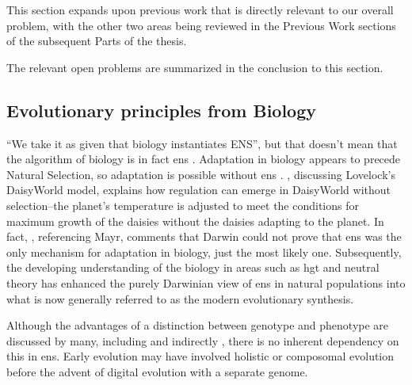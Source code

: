 This section expands upon previous work that is directly relevant to our overall problem, with the other two areas being reviewed in the Previous Work sections of the subsequent Parts of the thesis. 

The relevant open problems are summarized in the conclusion to this section.

\subsection{Evolutionary principles from Biology}

``We take it as given that biology instantiates ENS'', but that doesn't mean that the algorithm of biology is in fact \gls{ens} \autocite{Watson2012}. Adaptation in biology appears to precede Natural Selection, so adaptation is possible without \gls{ens} \cite{Watson2010}. \cite{Saunders1994}, discussing Lovelock's DaisyWorld model, explains how regulation can emerge in DaisyWorld without selection--the planet's temperature is adjusted to meet the conditions for maximum growth of the daisies without the daisies adapting to the planet. In fact, \cite{Saunders1994}, referencing Mayr, comments that Darwin could not prove that \gls{ens} was the only mechanism for adaptation in biology, just the most likely one. Subsequently, the developing understanding of the biology in areas such as \gls{hgt} and neutral theory \cite{Kimura:1968uq} has enhanced the purely Darwinian view of \gls{ens} in natural populations into what is now generally referred to as the modern evolutionary synthesis.

Although the advantages of a distinction between genotype and phenotype are discussed by many, including \autocite[section 7.2.3]{Taylor1999} and indirectly \cite{VonNeumann1966}, there is no inherent dependency on this in \gls{ens}. Early evolution may have involved holistic or composomal evolution before the advent of digital evolution with a separate genome.



